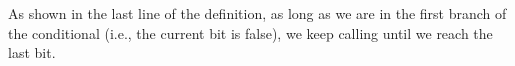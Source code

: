 As shown in the last line of the
definition, as long as we are in the first branch of the conditional
(i.e., the current bit is false), we keep calling  until
we reach the last bit.

  \begin{center}
  \resizebox{0.5\textwidth}{!}{}
  \end{center}



















